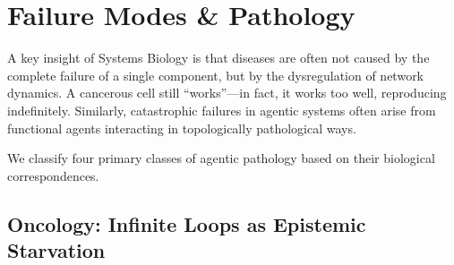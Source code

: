 \section{Failure Modes \& Pathology}

A key insight of Systems Biology is that diseases are often not caused by the complete failure of a single
component, but by the dysregulation of network dynamics. A cancerous cell still ``works''---in fact, it works
too well, reproducing indefinitely. Similarly, catastrophic failures in agentic systems often arise from
functional agents interacting in topologically pathological ways.

We classify four primary classes of agentic pathology based on their biological correspondences.

\subsection{Oncology: Infinite Loops as Epistemic Starvation}

